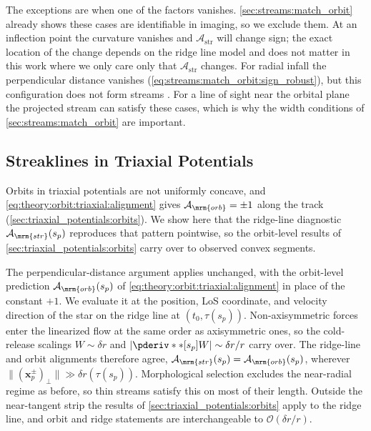\documentclass[linenumbers,twocolumn]{aastex701}
\renewcommand{\mbf}[1]{\boldsymbol{#1}}
\newcommand{\xvec}{\mbf{x}}  %
\newcommand{\Astr}{\mathcal{A}_{\mathrm{str}}}
\newcommand{\sarc}{s}  %
\newcommand{\proj}[1]{{#1}_{p}}  %
\newcommand{\xsky}{\proj{\xvec}}  %
\newcommand{\ssky}{\proj{\sarc}} %
\begin{document}
        The exceptions are when one of the factors vanishes. %
        \autoref{sec:streams:match_orbit} already shows these cases are identifiable in imaging, so we exclude them.
        At an inflection point the curvature vanishes and $\Astr$ will change sign; the exact location of the change depends on the ridge line model and does not matter in this work where we only care only that $\Astr$ changes. %
        For radial infall the perpendicular distance vanishes (\cref{eq:streams:match_orbit:sign_robust}), but this configuration does not form streams \citep{Hendel:2015:TidalDebrisMorphology}. %
        For a line of sight near the orbital plane the projected stream can satisfy these cases, which is why the width conditions of \autoref{sec:streams:match_orbit} are important. %


    \subsection{Streaklines in Triaxial Potentials}\label{sec:triaxial:streakline}

        Orbits in triaxial potentials are not uniformly concave, and \cref{eq:theory:orbit:triaxial:alignment} gives $\mathcal{A}_{\mrm{orb}}=\pm1$ along the track (\autoref{sec:triaxial_potentials:orbits}). %
        We show here that the ridge-line diagnostic $\mathcal{A}_{\mrm{str}}(\ssky)$ reproduces that pattern pointwise, so the orbit-level results of \autoref{sec:triaxial_potentials:orbits} carry over to observed convex segments. %

        The perpendicular-distance argument applies unchanged, with the orbit-level prediction $\mathcal{A}_{\mrm{orb}}(\ssky)$ of \cref{eq:theory:orbit:triaxial:alignment} in place of the constant $+1$. %
        We evaluate it at the position, \gls{LoS} coordinate, and velocity direction of the star on the ridge line at $(t_0,\tau(\ssky))$. %
        Non-axisymmetric forces enter the linearized flow at the same order as axisymmetric ones, so the cold-release scalings $W\sim\delta r$ and $|\pderiv**[\ssky]{W}|\sim\delta r/r$ carry over. %
        The ridge-line and orbit alignments therefore agree, $\mathcal{A}_{\mrm{str}}(\ssky) = \mathcal{A}_{\mrm{orb}}(\ssky)$, wherever $\|(\xsky^{\pm})_{\perp}\| \gg \delta r(\tau(\ssky))$. %
        Morphological selection \citep{Hendel:2015:TidalDebrisMorphology} excludes the near-radial regime as before, so thin streams satisfy this on most of their length. %
        Outside the near-tangent strip the results of \autoref{sec:triaxial_potentials:orbits} apply to the ridge line, and orbit and ridge statements are interchangeable to $\mathcal{O}(\delta r/r)$. %
\end{document}
